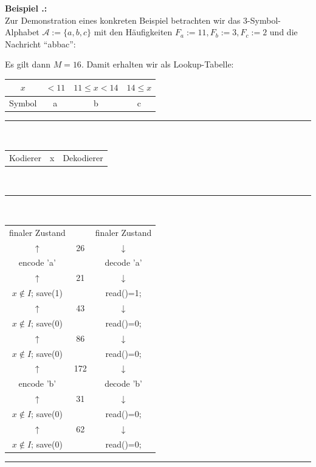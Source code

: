 \documentclass[a4paper,12pt]{article}
\newcommand{\A}{\mathcal A}
\newcounter{Beispiel}
\newenvironment{Beispiel}{
\medskip
        
        \setlength{\parindent}{0pt}
        \addtocounter{Beispiel}{1}
        \textbf{\textsf{Beispiel \thesubsection.\theBeispiel}:}\\}{
        \nopagebreak
        \vspace{-1.0ex}
        \bigskip
        
}
\begin{document}
\begin{Beispiel}
Zur Demonstration eines konkreten Beispiel betrachten wir das 3-Symbol-Alphabet $\A:=\{a, b, c\}$ mit den Häufigkeiten $F_{a}:=11, F_{b}:=3,  F_{c}:=2$ und die Nachricht "`abbac"':
\par
\vspace{0.5cm}
Es gilt dann $M=16$. Damit erhalten wir als Lookup-Tabelle:
\begin{center}
\begin{tabular}{c|c|c|c}
$x$ & $<11$ & $11 \leq x <14$ & $14\leq x$
\\
\hline
Symbol & a & b & c
\end{tabular}
\end{center}
\begin{center}
{\color{gray!50!blue}\rule{8cm}{0.5mm}}
\\
\begin{tabular}{c c c}
Kodierer & x & Dekodierer
\end{tabular}
\vspace{-0.2cm}
\\
{\color{gray!50!blue}\rule{8cm}{0.1mm}}
\\
\begin{tabular}{c c c}
finaler Zustand & & finaler Zustand
\\
$\uparrow$ & 26 & $\downarrow$
\\
encode 'a' & & decode 'a'
\\
$\uparrow$ & 21 & $\downarrow$
\\
$x \not\in I$; save(1) &  & read()=1;
\\
$\uparrow$ & 43 & $\downarrow$
\\
$x \not\in I$; save(0) &  & read()=0;
\\
$\uparrow$ & 86 & $\downarrow$
\\
$x \not\in I$; save(0) &  & read()=0;
\\
$\uparrow$ & 172 & $\downarrow$
\\
encode 'b' & & decode 'b'
\\
$\uparrow$ & 31 & $\downarrow$
\\
$x \not\in I$; save(0) &  & read()=0;
\\
$\uparrow$ & 62 & $\downarrow$
\\
$x \not\in I$; save(0) &  & read()=0;
\end{tabular}
\end{center}
\newpage
\begin{center}
{\color{gray!50!blue}\rule{8cm}{0.5mm}}
\\

\end{center}
\end{Beispiel}
\end{document}
